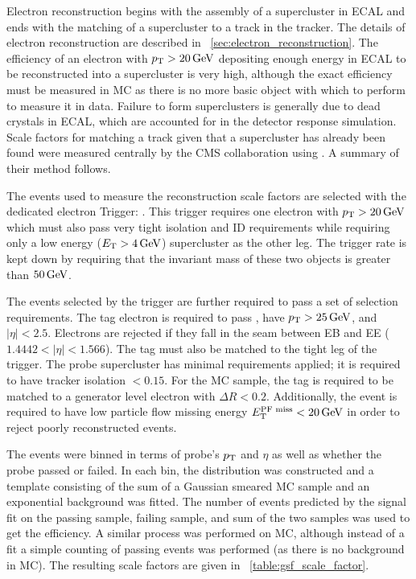 Electron reconstruction begins with the assembly of a supercluster in ECAL and
ends with the matching of a supercluster to a track in the tracker. The details
of electron reconstruction are described in
\SEC~\ref{sec:electron_reconstruction}. The efficiency of an electron with $p_{\mathrm{T}}
> 20 \,\text{Ge\hspace{-.08em}V}$ depositing enough energy in ECAL to be reconstructed into a
supercluster is very high, although the exact efficiency must be measured in
MC as there is no more basic object with which to perform \TnP to measure it in
data. Failure to form superclusters is generally due to dead crystals in ECAL,
which are accounted for in the detector response simulation. Scale factors for
matching a track given that a supercluster has already been found were measured
centrally by the CMS collaboration using \TnP \cite{gsf_scale_factors_2013}. A
summary of their method follows.

The events used to measure the reconstruction scale factors are selected with the
dedicated electron \TnP Trigger: \TnPTrigger. This trigger requires one
electron with $p_{\mathrm{T}} > 20 \,\text{Ge\hspace{-.08em}V}$ which must also pass very tight isolation and ID
requirements while requiring only a low energy ($E_{\mathrm{T}} > 4 \,\text{Ge\hspace{-.08em}V}$) supercluster as
the other leg. The trigger rate is kept down by requiring that the invariant
mass of these two objects is greater than $50 \,\text{Ge\hspace{-.08em}V}$.

The events selected by the trigger are further required to pass a set of
selection requirements. The tag electron is required to pass \EGTIGHT, have
$p_{\mathrm{T}} > 25 \,\text{Ge\hspace{-.08em}V}$, and $|\eta| < 2.5$. Electrons are rejected if they fall in the
seam between EB and EE ($1.4442 < |\eta| < 1.566$). The tag must also be
matched to the tight leg of the \TnP trigger. The probe supercluster has
minimal requirements applied; it is required to have tracker isolation $<
0.15$. For the MC sample, the tag is required to be matched to a generator
level electron with $\Delta R < 0.2$. Additionally, the event is required to
have low particle flow missing energy $E_{\mathrm{T}}^{\text{PF miss}} < 20 \,\text{Ge\hspace{-.08em}V}$ in order to reject
poorly reconstructed events.

The events were binned in terms of probe's $p_{\mathrm{T}}$ and $\eta$ as well as whether
the probe passed or failed. In each bin, the \mee distribution was constructed
and a template consisting of the sum of a Gaussian smeared \Ztoee MC sample and
an exponential background was fitted. The number of events predicted by the
signal fit on the passing sample, failing sample, and sum of the two samples
was used to get the efficiency. A similar process was performed on MC, although
instead of a fit a simple counting of passing events was performed (as there is
no background in MC). The resulting scale factors are given in
\TAB~\ref{table:gsf_scale_factor}.

